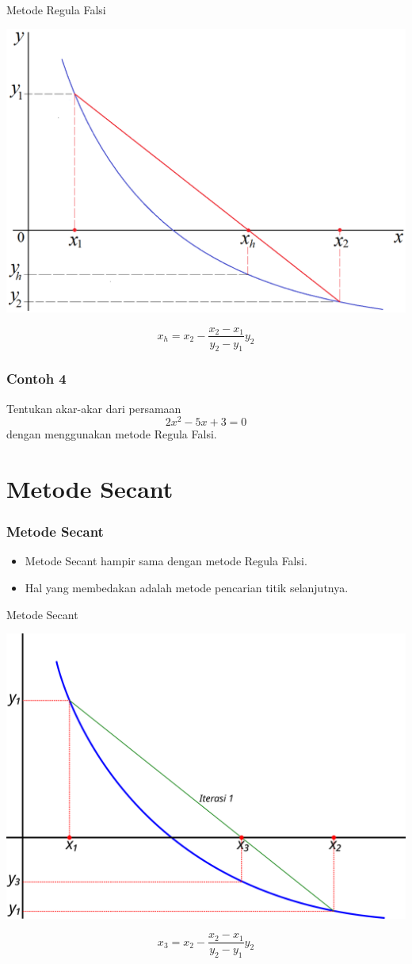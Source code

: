 \documentclass[pdflatex,compress,mathserif]{beamer}
\begin{document}
\begin{frame}{Metode Regula Falsi}
	\begin{center}
		\includegraphics[width=0.7\linewidth]{img/03}
	\end{center}
	$$ x_h = x_2 - \frac{x_2 - x_1}{y_2 - y_1}y_2 $$
\end{frame}

\begin{frame}
	\frametitle{Contoh 4}
	Tentukan akar-akar dari persamaan $$ 2x^2 - 5x + 3 = 0 $$ dengan menggunakan metode Regula Falsi.
\end{frame}

\section{Metode Secant}

\begin{frame}
	\frametitle{Metode Secant}
	\begin{itemize}
		\item Metode Secant hampir sama dengan metode Regula Falsi.
		\item Hal yang membedakan adalah metode pencarian titik selanjutnya.
	\end{itemize}
\end{frame}

\begin{frame}{Metode Secant}
	\begin{center}
		\includegraphics[width=0.7\linewidth]{img/04}
	\end{center}
	$$ x_3 = x_{2} - \frac{x_{2}-x_{1}}{y_{2}-y_{1}}y_{2} $$
\end{frame}
\end{document}
